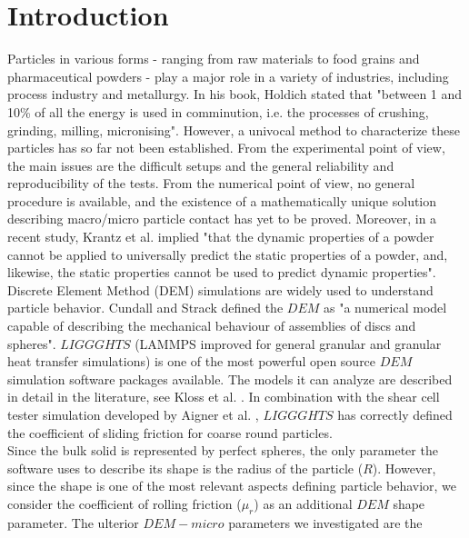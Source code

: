 \section{Introduction}
\label{sec:introduction}

Particles in various forms - ranging from raw materials to food grains and pharmaceutical powders - play a major role in a variety of industries, 
including process industry and metallurgy. In his book, Holdich \cite{RefWorks:117}
stated that "between 1 and 10\% of all the energy is used in comminution, i.e. the processes of crushing, grinding, milling, micronising". 
However, a univocal method to characterize these particles has so far not been established.
From the experimental point of view, the main issues are the difficult setups and the general reliability and reproducibility of the tests. 
From the numerical point of view, no general procedure is available, and the existence of a mathematically unique solution describing macro/micro particle contact has yet to be proved.
Moreover, in a recent study, Krantz et al. \cite{RefWorks:56} implied "that the dynamic properties of a powder cannot be applied to universally predict the static properties of a powder, and,
likewise, the static properties cannot be used to predict dynamic properties".\\
Discrete Element Method (DEM) simulations are widely used to understand particle behavior.
Cundall and Strack \cite{RefWorks:172} defined the $DEM$ as "a numerical model capable of describing the mechanical behaviour of assemblies of discs and spheres".
$LIGGGHTS$ (LAMMPS improved for general granular and granular heat transfer simulations) is one of the most powerful open source $DEM$ simulation software packages available.
The models it can analyze are described in detail in the literature, see Kloss
et al. \cite{RefWorks:136}.\label{par:overviewdemliggghts} In combination with
the shear cell tester simulation developed by Aigner et al. \cite{RefWorks:139},
$LIGGGHTS$ has correctly defined the coefficient of sliding friction for coarse round particles.\\
Since the bulk solid is represented by perfect spheres, the only parameter the software uses to describe its shape is the radius of the particle ($R$).
However, since the shape is one of the most relevant aspects defining particle behavior, we consider the coefficient of rolling friction ($\mu_r$) as an additional $DEM$ shape parameter.
The ulterior $DEM-micro$ parameters we investigated are the

